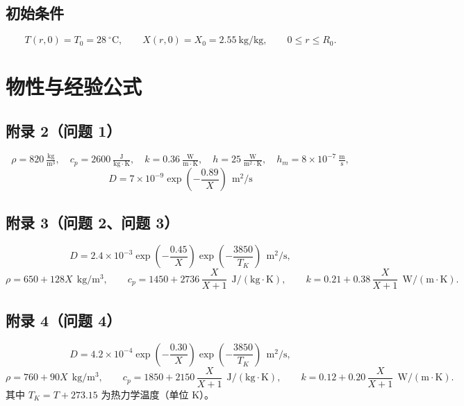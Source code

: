 \documentclass[11pt]{ctexart}
\begin{document}
\subsection*{初始条件}
\begin{equation}
T(r,0)=T_0=28\ ^\circ\mathrm{C},\qquad
X(r,0)=X_0=2.55\ \mathrm{kg/kg},\qquad 0\le r\le R_0 .
\end{equation}

\section{物性与经验公式}

\subsection*{附录 2（问题 1）}
\begin{equation}
\rho=820\ \tfrac{\mathrm{kg}}{\mathrm m^3},\quad
c_p=2600\ \tfrac{\mathrm J}{\mathrm{kg\cdot K}},\quad
k=0.36\ \tfrac{\mathrm W}{\mathrm{m\cdot K}},\quad
h=25\ \tfrac{\mathrm W}{\mathrm{m^2\cdot K}},\quad
h_m=8\times10^{-7}\ \tfrac{\mathrm m}{\mathrm s},
\end{equation}
\begin{equation}
\boxed{\;D=7\times10^{-9}\exp\!\left(-\frac{0.89}{X}\right)\ \ \mathrm{m^2/s}\;}
\end{equation}

\subsection*{附录 3（问题 2、问题 3）}
\begin{equation}
D=2.4\times10^{-3}\exp\!\left(-\frac{0.45}{X}\right)\exp\!\left(-\frac{3850}{T_K}\right)
\ \ \mathrm{m^2/s},
\end{equation}
\begin{equation}
\rho=650+128X\ \ \mathrm{kg/m^3},
\qquad
c_p=1450+2736\,\frac{X}{X+1}\ \ \mathrm{J/(kg\cdot K)},
\qquad
k=0.21+0.38\,\frac{X}{X+1}\ \ \mathrm{W/(m\cdot K)} .
\end{equation}

\subsection*{附录 4（问题 4）}
\begin{equation}
D=4.2\times10^{-4}\exp\!\left(-\frac{0.30}{X}\right)\exp\!\left(-\frac{3850}{T_K}\right)
\ \ \mathrm{m^2/s},
\end{equation}
\begin{equation}
\rho=760+90X\ \ \mathrm{kg/m^3},
\qquad
c_p=1850+2150\,\frac{X}{X+1}\ \ \mathrm{J/(kg\cdot K)},
\qquad
k=0.12+0.20\,\frac{X}{X+1}\ \ \mathrm{W/(m\cdot K)} .
\end{equation}
其中 $T_K=T+273.15$ 为热力学温度（单位 K）。
\end{document}
